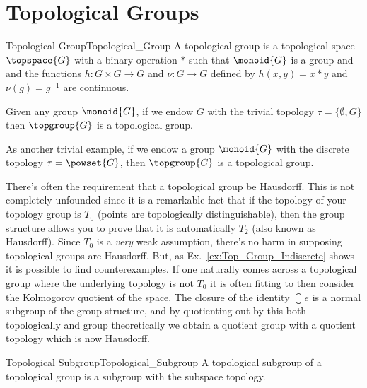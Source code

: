 \documentclass{book}                                                           %
\begin{document}
        \section{Topological Groups}
            \begin{fdefinition}{Topological Group}{Topological_Group}
                A topological group is a topological space $\topspace{G}$ with a
                binary operation $*$ such that $\monoid{G}$ is a group and and
                the functions $h:G\times{G}\rightarrow{G}$ and
                $\nu:G\rightarrow{G}$ defined by $h(x,y)=x*y$ and
                $\nu(g)=g^{\minus{1}}$ are continuous.
            \end{fdefinition}
            \begin{example}
                \label{ex:Top_Group_Indiscrete}%
                Given any group $\monoid{G}$, if we endow $G$ with the trivial
                topology $\tau=\{\emptyset,G\}$ then $\topgroup{G}$ is a
                topological group.
            \end{example}
            \begin{example}
                As another trivial example, if we endow a group $\monoid{G}$
                with the discrete topology $\tau=\powset{G}$, then
                $\topgroup{G}$ is a topological group. 
            \end{example}
            There's often the requirement that a topological group be Hausdorff.
            This is not completely unfounded since it is a remarkable fact that
            if the topology of your topology group is $T_{0}$ (points are
            topologically distinguishable), then the group structure allows you
            to prove that it is automatically $T_{2}$ (also known as Hausdorff).
            Since $T_{0}$ is a \textit{very} weak assumption, there's no harm in
            supposing topological groups are Hausdorff. But, as
            Ex.~\ref{ex:Top_Group_Indiscrete} shows it is possible to find
            counterexamples. If one naturally comes across a topological group
            where the underlying topology is not $T_{0}$ it is often fitting to
            then consider the Kolmogorov quotient of the space. The closure of
            the identity $\closure{e}$ is a normal subgroup of the group
            structure, and by quotienting out by this both topologically and
            group theoretically we obtain a quotient group with a quotient
            topology which is now Hausdorff.
            \begin{fdefinition}{Topological Subgroup}{Topological_Subgroup}
                A topological subgroup of a topological group is a subgroup with
                the subspace topology.
            \end{fdefinition}
\end{document}
